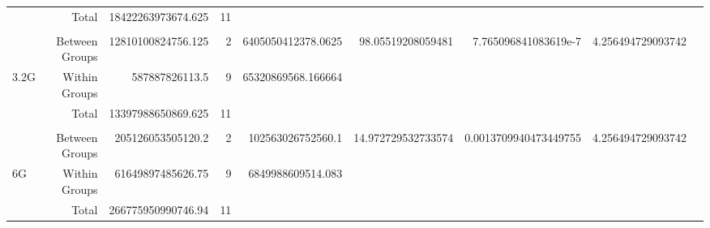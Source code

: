 \begin{landscape}
\begin{table}[!htp]
\begin{tabular}{lrrrrrrrr}
&Total &18422263973674.625 &11 & & & & \\
& & & & & & & \\
&Between Groups &12810100824756.125 &2 &6405050412378.0625 &98.05519208059481 &7.765096841083619e-7 &4.256494729093742 \\
3.2G &Within Groups &587887826113.5 &9 &65320869568.166664 & & & \\
&Total &13397988650869.625 &11 & & & & \\
& & & & & & & \\
&Between Groups &205126053505120.2 &2 &102563026752560.1 &14.972729532733574 &0.0013709940473449755 &4.256494729093742 \\
6G &Within Groups &61649897485626.75 &9 &6849988609514.083 & & & \\
&Total &266775950990746.94 &11 & & & & \\
\bottomrule
\end{tabular}
\end{table}
\end{landscape}


